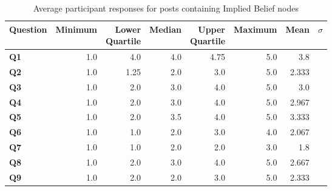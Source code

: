 \begin{table}
\centering
\caption{Average participant responses for posts containing Implied Belief nodes}
\label{table:perception:implied-belief-average}
\begin{tabular}{ l | r | r | r | r | r | r | r}
\textbf{Question} & \textbf{Minimum} & \pbox{2cm}{\textbf{Lower}\\ \textbf{Quartile}} & \textbf{Median} & \pbox{2cm}{\textbf{Upper}\\ \textbf{Quartile}} & \textbf{Maximum} & \textbf{Mean} & \textbf{$\sigma$}\\
\hline
\textbf{Q1} &  1.0 & 4.0 & 4.0 & 4.75 & 5.0 & 3.8 &  \\
\hline
\textbf{Q2} &  1.0 & 1.25 & 2.0 & 3.0 & 5.0 & 2.333 &  \\
\hline
\textbf{Q3} &  1.0 & 2.0 & 3.0 & 4.0 & 5.0 & 3.0 &  \\
\hline
\textbf{Q4} &  1.0 & 2.0 & 3.0 & 4.0 & 5.0 & 2.967 &  \\
\hline
\textbf{Q5} &  1.0 & 2.0 & 3.5 & 4.0 & 5.0 & 3.333 &  \\
\hline
\textbf{Q6} &  1.0 & 1.0 & 2.0 & 3.0 & 4.0 & 2.067 &  \\
\hline
\textbf{Q7} &  1.0 & 1.0 & 2.0 & 2.0 & 3.0 & 1.8 &  \\
\hline
\textbf{Q8} &  1.0 & 2.0 & 3.0 & 4.0 & 5.0 & 2.667 &  \\
\hline
\textbf{Q9} &  1.0 & 2.0 & 2.0 & 3.0 & 5.0 & 2.333 &  \\
\end{tabular}
\end{table}




